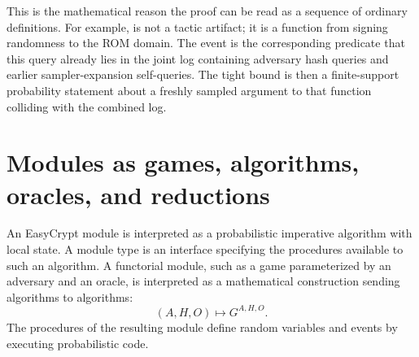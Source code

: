 This is the mathematical reason the proof can be read as a sequence of
ordinary definitions.  For example,  is not a
tactic artifact; it is a function from signing randomness to the ROM domain.
The event  is the corresponding predicate that
this query already lies in the joint log containing adversary hash queries and
earlier sampler-expansion self-queries.  The tight bound is then a
finite-support probability statement about a freshly sampled argument to that
function colliding with the combined log.

\section{Modules as games, algorithms, oracles, and reductions}
\label{app:modules-as-games}

An EasyCrypt module is interpreted as a probabilistic imperative algorithm with
local state.  A module type is an interface specifying the procedures available
to such an algorithm.  A functorial module, such as a game parameterized by an
adversary and an oracle, is interpreted as a mathematical construction sending
algorithms to algorithms:
\[
  (A,H,O) \longmapsto G^{A,H,O}.
\]
The procedures of the resulting module define random variables and events by
executing probabilistic code.

